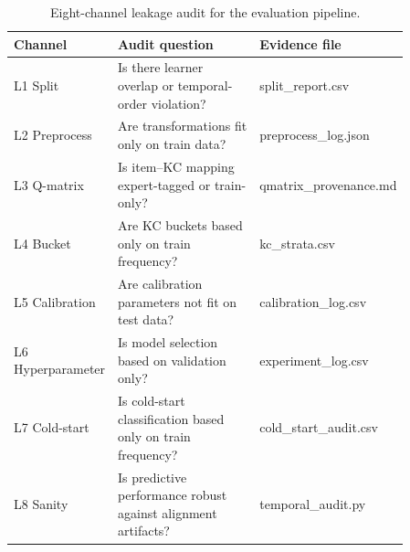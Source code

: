 \begin{table}[t]
\centering
\caption{Eight-channel leakage audit for the evaluation pipeline.}
\label{tab:leakage}
\footnotesize
\begin{tabular}{p{0.16\linewidth}p{0.48\linewidth}p{0.22\linewidth}}
\toprule
Channel & Audit question & Evidence file \\
\midrule
L1 Split & Is there learner overlap or temporal-order violation? & split\_report.csv \\
L2 Preprocess & Are transformations fit only on train data? & preprocess\_log.json \\
L3 Q-matrix & Is item--KC mapping expert-tagged or train-only? & qmatrix\_provenance.md \\
L4 Bucket & Are KC buckets based only on train frequency? & kc\_strata.csv \\
L5 Calibration & Are calibration parameters not fit on test data? & calibration\_log.csv \\
L6 Hyperparameter & Is model selection based on validation only? & experiment\_log.csv \\
L7 Cold-start & Is cold-start classification based only on train frequency? & cold\_start\_audit.csv \\
L8 Sanity & Is predictive performance robust against alignment artifacts? & temporal\_audit.py \\
\bottomrule
\end{tabular}
\end{table}
